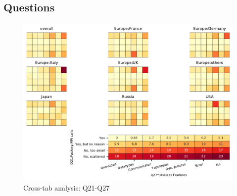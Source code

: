 
\subsection{Questions}


\begin{figure}
\begin{center}
\includegraphics[width=12cm]{../pdfs/Q21-Q27.pdf}
\caption{Cross-tab analysis: Q21-Q27}
\label{fig:Q21-Q27}
\end{center}
\end{figure}
